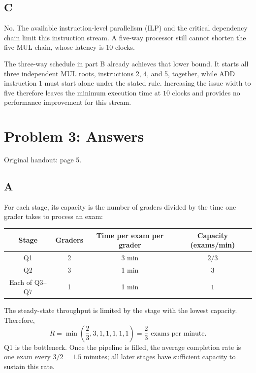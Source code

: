 \documentclass[letterpaper,12pt]{article}
\newcommand{\handout}[1]{%
  
}
\newenvironment{answer}{\par}{\par\medskip}
\begin{document}
\subsection*{C}
\begin{answer}
No. The available instruction-level parallelism (ILP) and the critical
dependency chain limit this instruction stream. A five-way processor
still cannot shorten the five-MUL chain, whose latency is 10 clocks.

The three-way schedule in part B already achieves that lower bound.
It starts all three independent MUL roots, instructions 2, 4, and 5,
together, while ADD instruction 1 must start alone under the stated rule.
Increasing the issue width to five therefore leaves the minimum execution
time at $\boxed{10\text{ clocks}}$ and provides no performance improvement
for this stream.
\end{answer}

\clearpage

\handout{5}
\section*{Problem 3: Answers}
\noindent Original handout: page 5.\par

\subsection*{A}
\begin{answer}
For each stage, its capacity is the number of graders divided by the time
one grader takes to process an exam:

\begin{center}
\begin{tabular}{c|c|c|c}
  Stage & Graders & Time per exam per grader & Capacity (exams/min) \\
  \hline
  Q1 & 2 & 3 min & $2/3$ \\
  Q2 & 3 & 1 min & $3$ \\
  Each of Q3--Q7 & 1 & 1 min & $1$
\end{tabular}
\end{center}

The steady-state throughput is limited by the stage with the lowest
capacity. Therefore,
\[
  R = \min\left(\frac{2}{3},3,1,1,1,1,1\right)
    = \boxed{\frac{2}{3}\text{ exams per minute}}.
\]
Q1 is the bottleneck. Once the pipeline is filled, the average completion
rate is one exam every $3/2=1.5$ minutes; all later stages have sufficient
capacity to sustain this rate.
\end{answer}
\end{document}
